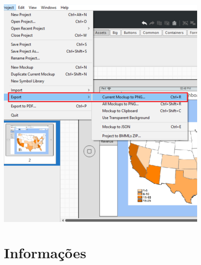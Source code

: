 \documentclass{tufte-book} %
\begin{document}
\begin{center}
	\includegraphics{img24.png}
\end{center}

\chapter{Informações}


\backmatter





\printindex
\end{document}
